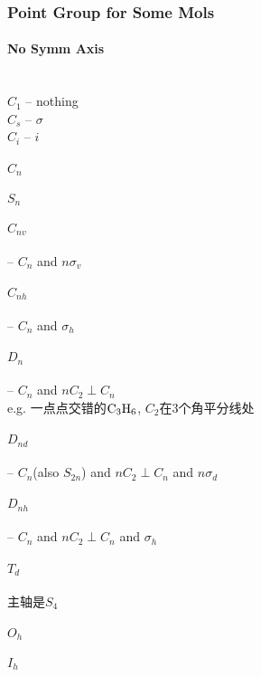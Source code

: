 \documentclass[a4paper]{article}
\numberwithin{equation}{section}
\begin{document}
\subsubsection{Point Group for Some Mols}
\paragraph{No Symm Axis}~\\
$ C_1 $ -- nothing\\
$ C_s $ -- $ \sigma $\\
$ C_i $ -- $ i $\\
\paragraph{$ C_n $}
\paragraph{$ S_n $}
\paragraph{$ C_{nv} $} -- $ C_n $ and $ n\sigma_v $
\paragraph{$ C_{nh} $} -- $ C_n $ and $ \sigma_h $
\paragraph{$ D_n $} -- $ C_n $ and $ nC_2 \perp C_n$\\
e.g. 一点点交错的$ \ce{C_3H_6} $, $ C_2 $在3个角平分线处
\paragraph{$ D_{nd} $} -- $ C_n $(also $ S_{2n} $) and $ nC_2 \perp C_n$ and $ n\sigma_d $ 
\paragraph{$ D_{nh} $} -- $ C_n $ and $ nC_2 \perp C_n$ and $ \sigma_h $ 
\paragraph{$ T_d $} 主轴是$ S_4 $
\paragraph{$ O_h $}
\paragraph{$ I_h $}
\end{document}
